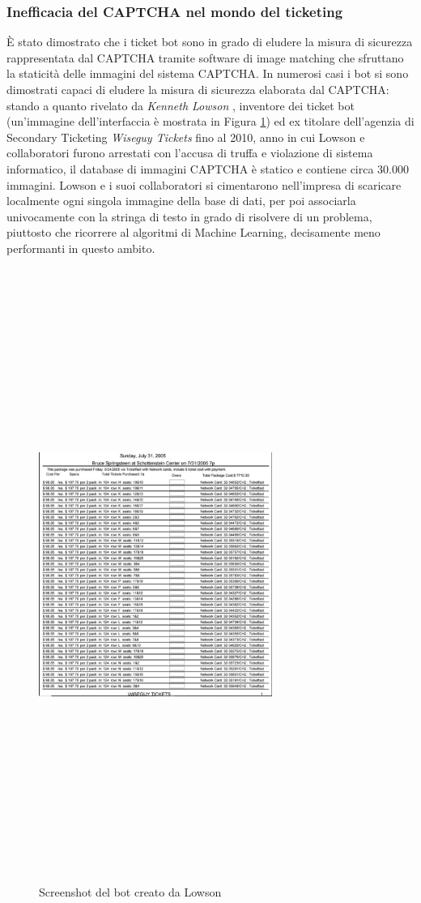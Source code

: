 \subsubsection{Inefficacia del CAPTCHA nel mondo del ticketing}
\`E stato dimostrato che i ticket bot sono in grado di eludere la misura di sicurezza rappresentata dal CAPTCHA tramite software di image matching che sfruttano la staticità delle immagini del sistema CAPTCHA.
In numerosi casi i bot si sono dimostrati capaci di eludere la misura di sicurezza elaborata dal CAPTCHA: stando a quanto rivelato da \textit{Kenneth Lowson} \cite{vicelowson}, inventore dei ticket bot (un'immagine dell'interfaccia è mostrata in Figura \ref{bot1}) ed ex titolare dell'agenzia di Secondary Ticketing \textit{Wiseguy Tickets} fino al 2010, anno in cui Lowson e collaboratori furono arrestati con l'accusa di truffa e violazione di sistema informatico, il database di immagini CAPTCHA è statico e contiene circa 30.000 immagini. Lowson e i suoi collaboratori si cimentarono nell'impresa di scaricare localmente ogni singola immagine della base di dati, per poi associarla univocamente con la stringa di testo in grado di risolvere di un problema, piuttosto che ricorrere al algoritmi di Machine Learning, decisamente meno performanti in questo ambito. 
\begin{figure}[H]
	\centering
	\includegraphics[width=0.68\textwidth, height=20cm]{chapter4/immagini/bot1}
	\caption{Screenshot del bot creato da Lowson}
	\label{bot1}
\end{figure} 
